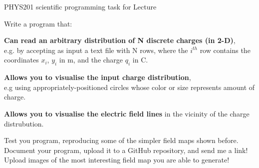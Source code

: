 {
\programmingslide

%
%
%

\begin{frame}{PHYS201 scientific programming task for Lecture \thislecture}

{\small

Write a program that:
\begin{itemize}
{\scriptsize
  \item {\bf Can read an arbitrary distribution of N discrete charges (in 2-D)},\\
        e.g. by accepting as input a text file with N rows, where the $i^{th}$
        row contains the coordinates $x_i$, $y_i$ in m, and the charge $q_i$ in C.
  \item {\bf Allows you to visualise the input charge distribution},\\
        e.g using appropriately-positioned circles whose color or size represents amount of charge.
  \item {\bf Allows you to visualise the electric field lines}
        in the vicinity of the charge distrubution.\\
}
\end{itemize}

\vspace{0.2cm}
Test you program, reproducing some of the simpler field maps shown before.\\

\vspace{0.2cm}
Document your program, upload it to a GitHub repository, and send me a link!\\

\vspace{0.2cm}
Upload images of the most interesting field map you are able to generate!\\


}

\end{frame}


} %



